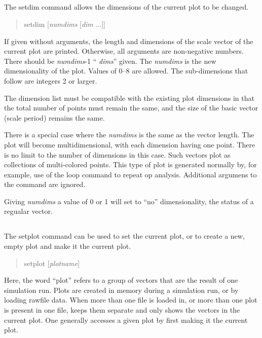 \subsection{}


The {\cb setdim} command allows the dimensions of the current plot to
be changed.

\begin{quote}
{\vt setdim} [{\it numdims} [{\it dim} ...]]
\end{quote}
  
If given without arguments, the length and dimensions of the scale
vector of the current plot are printed.  Otherwise, all arguments are
non-negative numbers.  There should be {\it numdims\/}-1 ``{\it
dims}'' given.  The {\it numdims} is the new dimensionality of the
plot.  Values of 0--8 are allowed.  The sub-dimensions that follow are
integers 2 or larger.

The dimension list must be compatible with the existing plot
dimensions in that the total number of points must remain the same,
and the size of the basic vector (scale period) remains the same.

There is a special case where the {\it numdims} is the same as the
vector length.  The plot will become multidimensional, with each
dimension having one point.  There is no limit to the number of
dimensions in this case.  Such vectors plot as collections of
multi-colored points.  This type of plot is generated normally by, for
example, use of the {\cb loop} command to repeat op analysis. 
Additional argumens to the command are ignored.

Giving {\it numdims} a value of 0 or 1 will set to ``no''
dimensionality, the status of a regualar vector.

\subsection{}


The {\cb setplot} command can be used to set the current plot, or to
create a new, empty plot and make it the current plot.
\begin{quote}\vt
setplot [{\it plotname\/}]
\end{quote}
Here, the word ``plot'' refers to a group of vectors that are the
result of one {\WRspice} simulation run.  Plots are created in memory
during a simulation run, or by loading rawfile data.  When more than
one file is loaded in, or more than one plot is present in one file,
{\WRspice} keeps them separate and only shows the vectors in the
current plot.  One generally accesses a given plot by first making it
the current plot. 

